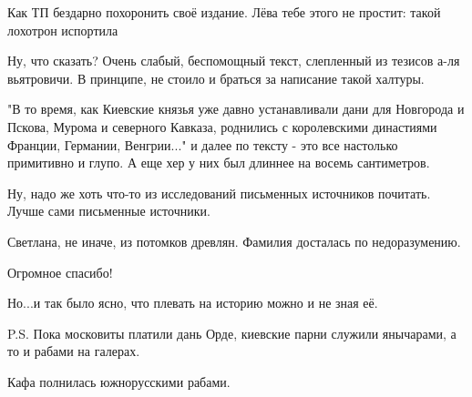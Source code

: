 \begin{itemize}
 
Как ТП бездарно похоронить своё издание. Лёва тебе этого не простит: такой лохотрон испортила

 

Ну, что сказать? Очень слабый, беспомощный текст, слепленный из тезисов а-ля
вьятровичи. В принципе, не стоило и браться за написание такой халтуры.

"В то время, как Киевские князья уже давно устанавливали дани для Новгорода и
Пскова, Мурома и северного Кавказа, роднились с королевскими династиями
Франции, Германии, Венгрии..." и далее по тексту - это все настолько примитивно
и глупо. А еще хер у них был длиннее на восемь сантиметров.

Ну, надо же хоть что-то из исследований письменных источников почитать. Лучше
сами письменные источники.

 

Светлана, не иначе, из потомков древлян. Фамилия досталась по недоразумению.


 

Огромное спасибо!

Но...и так было ясно, что плевать на историю можно и не зная её.

P.S. Пока московиты платили дань Орде, киевские парни служили янычарами, а то и
рабами на галерах.

Кафа полнилась южнорусскими рабами.

 


\end{itemize}
